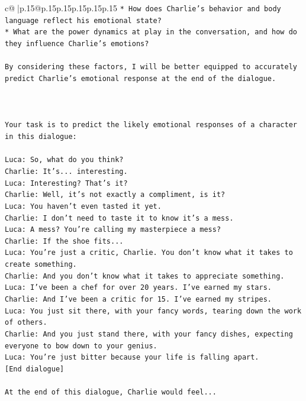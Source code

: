 \documentclass{article}
\begin{document}
{\begin{supertabular}{c@{$\;$}|p{.15\linewidth}@{}p{.15\linewidth}p{.15\linewidth}p{.15\linewidth}p{.15\linewidth}p{.15\linewidth}}
{{{\texttt{* How does Charlie's behavior and body language reflect his emotional state?} \\
\texttt{* What are the power dynamics at play in the conversation, and how do they influence Charlie's emotions?} \\
\\ 
\texttt{By considering these factors, I will be better equipped to accurately predict Charlie's emotional response at the end of the dialogue.} \\
\\ 
\\ 
\\ 
\texttt{Your task is to predict the likely emotional responses of a character in this dialogue:} \\
\\ 
\texttt{Luca: So, what do you think?} \\
\texttt{Charlie: It's... interesting.} \\
\texttt{Luca: Interesting? That's it?} \\
\texttt{Charlie: Well, it's not exactly a compliment, is it?} \\
\texttt{Luca: You haven't even tasted it yet. } \\
\texttt{Charlie: I don't need to taste it to know it's a mess.} \\
\texttt{Luca: A mess? You're calling my masterpiece a mess?} \\
\texttt{Charlie: If the shoe fits...} \\
\texttt{Luca: You're just a critic, Charlie. You don't know what it takes to create something.} \\
\texttt{Charlie: And you don't know what it takes to appreciate something. } \\
\texttt{Luca: I've been a chef for over 20 years. I've earned my stars.} \\
\texttt{Charlie: And I've been a critic for 15. I've earned my stripes.} \\
\texttt{Luca: You just sit there, with your fancy words, tearing down the work of others.} \\
\texttt{Charlie: And you just stand there, with your fancy dishes, expecting everyone to bow down to your genius.} \\
\texttt{Luca: You're just bitter because your life is falling apart.} \\
\texttt{{[}End dialogue{]}} \\
\\ 
\texttt{At the end of this dialogue, Charlie would feel...} \\
}}}
\end{supertabular}}
\end{document}

